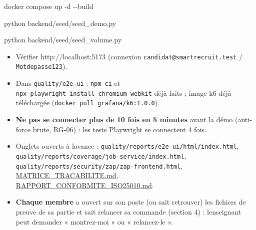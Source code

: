 \documentclass[
  11pt,
]{article}
\newenvironment{Shaded}{}{}
\newcommand{\AttributeTok}[1]{\textcolor[rgb]{0.49,0.56,0.16}{#1}}
\newcommand{\ExtensionTok}[1]{#1}
\newcommand{\NormalTok}[1]{#1}
\providecommand{\tightlist}{%
  \setlength{\itemsep}{0pt}\setlength{\parskip}{0pt}}
\begin{document}
\begin{Shaded}
\begin{Highlighting}[]
\ExtensionTok{docker}\NormalTok{ compose up }\AttributeTok{{-}d} \AttributeTok{{-}{-}build}
\end{Highlighting}
\end{Shaded}

\begin{Shaded}
\begin{Highlighting}[]
\ExtensionTok{python}\NormalTok{ backend/seed/seed\_demo.py}
\end{Highlighting}
\end{Shaded}

\begin{Shaded}
\begin{Highlighting}[]
\ExtensionTok{python}\NormalTok{ backend/seed/seed\_volume.py}
\end{Highlighting}
\end{Shaded}

\begin{itemize}
\tightlist
\item
  Vérifier http://localhost:5173 (connexion
  \texttt{candidat@smartrecruit.}\allowbreak{}\texttt{test} /
  \texttt{Motdepasse123}).
\item
  Dans \texttt{quality/e2e-ui} : \texttt{npm\ ci} et
  \texttt{npx\ playwright\ install\ chromium\ webkit} déjà faits ; image
  k6 déjà téléchargée
  (\texttt{docker\ pull\ grafana/}\allowbreak{}\texttt{k6:1.}\allowbreak{}\texttt{0.}\allowbreak{}\texttt{0}).
\item
  \textbf{Ne pas se connecter plus de 10 fois en 5 minutes} avant la
  démo (anti-force brute, RG‑06) : les tests Playwright se connectent 4
  fois.
\item
  Onglets ouverts à l\textquotesingle avance :
  \texttt{quality/}\allowbreak{}\texttt{reports/}\allowbreak{}\texttt{e2e-}\allowbreak{}\texttt{ui/}\allowbreak{}\texttt{html/}\allowbreak{}\texttt{index.}\allowbreak{}\texttt{html},
  \texttt{quality/}\allowbreak{}\texttt{reports/}\allowbreak{}\texttt{coverage/}\allowbreak{}\texttt{job-}\allowbreak{}\texttt{service/}\allowbreak{}\texttt{index.}\allowbreak{}\texttt{html},
  \texttt{quality/}\allowbreak{}\texttt{reports/}\allowbreak{}\texttt{security/}\allowbreak{}\texttt{zap/}\allowbreak{}\texttt{zap-}\allowbreak{}\texttt{frontend.}\allowbreak{}\texttt{html},
  \href{MATRICE_TRACABILITE.pdf}{MATRICE\_TRACABILITE.md},
  \href{RAPPORT_CONFORMITE_ISO25010.pdf}{RAPPORT\_CONFORMITE\_ISO25010.md}.
\item
  \textbf{Chaque membre} a ouvert sur son poste (ou sait retrouver) les
  fichiers de preuve de sa partie et sait relancer sa commande (section
  4) : l\textquotesingle enseignant peut demander « montrez-moi » ou «
  relancez-le ».
\end{itemize}
\end{document}
